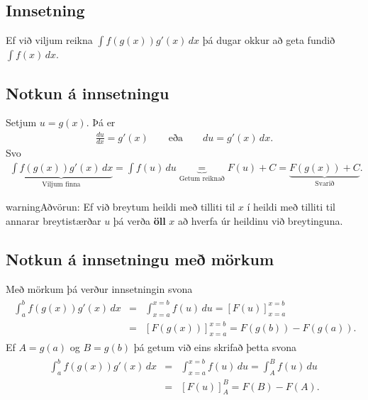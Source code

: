 \documentclass[b5paper,11pt,icelandic]{sphinxmanual}
\begin{document}
\subsection{Innsetning}
\label{kafli06:index-9}\label{kafli06:innsetning}
Ef við viljum reikna \(\int f(g(x))g'(x)\, dx\) þá dugar okkur að
geta fundið \(\int f(x)\, dx\).


\subsection{Notkun á innsetningu}
\label{kafli06:notkun-a-innsetningu}
Setjum \(u=g(x)\). Þá er
\begin{equation*}
\begin{split}\frac{du}{dx}=g'(x)\qquad \text{eða} \qquad du=g'(x)\,dx.\end{split}
\end{equation*}
Svo
\begin{equation*}
\begin{split}\underbrace{\int f(g(x))g'(x)\,dx}_{\text{Viljum finna}}  =
\int f(u)\,du
\underbrace{=}_{\text{Getum reiknað}} F(u)+C  =
\underbrace{F(g(x))+C}_{\text{Svarið}}.\end{split}
\end{equation*}
\begin{notice}{warning}{Aðvörun:}
Ef við breytum heildi með tilliti til \(x\) í heildi með tilliti til
annarar breytistærðar \(u\) þá verða \textbf{öll} \(x\) að hverfa úr
heildinu við breytinguna.
\end{notice}


\subsection{Notkun á innsetningu með mörkum}
\label{kafli06:notkun-a-innsetningu-me-morkum}
Með mörkum þá verður innsetningin svona
\begin{equation*}
\begin{split}\begin{aligned}
  \int_a^b f(g(x))g'(x)\, dx  &=&
  \int_{x=a}^{x=b} f(u)\, du  =
  [F(u)]_{x=a}^{x=b}    \\ &=&
  [F(g(x))]_{x=a}^{x=b}     =
  F(g(b)) - F(g(a)).\end{aligned}\end{split}
\end{equation*}
Ef \(A=g(a)\) og \(B=g(b)\) þá getum við eins skrifað þetta
svona
\begin{equation*}
\begin{split}\begin{aligned}
\int_a^b f(g(x))g'(x)\, dx  &=&
\int_{x=a}^{x=b} f(u)\, du  =
\int_{A}^{B} f(u)\, du    \\ &=&
[F(u)]_A^B      =
F(B) - F(A).\end{aligned}\end{split}
\end{equation*}
\end{document}
